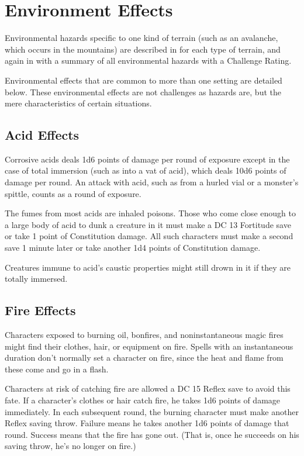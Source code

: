 \section{Environment Effects}
Environmental hazards specific to one kind of terrain (such as an avalanche, which occurs in the mountains) are described in  for each type of terrain, and again in  with a summary of all environmental hazards with a Challenge Rating.

Environmental effects that are common to more than one setting are detailed below. These environmental effects are not challenges as hazards are, but the mere characteristics of certain situations.

\subsection{Acid Effects}
Corrosive acids deals 1d6 points of damage per round of exposure except in the case of total immersion (such as into a vat of acid), which deals 10d6 points of damage per round. An attack with acid, such as from a hurled vial or a monster's spittle, counts as a round of exposure.

The fumes from most acids are inhaled poisons. Those who come close enough to a large body of acid to dunk a creature in it must make a DC 13 Fortitude save or take 1 point of Constitution damage. All such characters must make a second save 1 minute later or take another 1d4 points of Constitution damage.

Creatures immune to acid's caustic properties might still drown in it if they are totally immersed.


\subsection{Fire Effects}
Characters exposed to burning oil, bonfires, and noninstantaneous magic fires might find their clothes, hair, or equipment on fire. Spells with an instantaneous duration don't normally set a character on fire, since the heat and flame from these come and go in a flash.

Characters at risk of catching fire are allowed a DC 15 Reflex save to avoid this fate. If a character's clothes or hair catch fire, he takes 1d6 points of damage immediately. In each subsequent round, the burning character must make another Reflex saving throw. Failure means he takes another 1d6 points of damage that round. Success means that the fire has gone out. (That is, once he succeeds on his saving throw, he's no longer on fire.)

